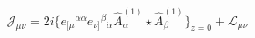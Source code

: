 \begin{equation}
\mathcal{J}_{\mu\nu}  =  2i\big\{
e_{[\mu}{}^{\alpha\dot\alpha} e_{\nu]}{}^\beta{}_{\dot\alpha} 
\widehat A^{(1)}_\alpha
\star \widehat A^{(1)}_\beta \big\}_{z=0} + \mathcal{L}_{\mu\nu}
\label{eq:curlJ}
\end{equation}

